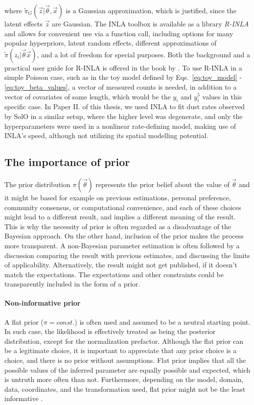 where $\tilde{\pi}_G(\vec{z}|\vec{\theta},\vec{x})$ is a Gaussian approximation, which is justified, since the latent effects $\vec{z}$ are Gaussian. The INLA toolbox is available as a library \textit{R-INLA} \citep{rinla} and allows for convenient use via a function call, including options for many popular hyperpriors, latent random effects, different approximations of $\tilde{\pi}(z_i|\vec{\theta} \vec{x})$, and a lot of freedom for special purposes. Both the background and a practical user guide for R-INLA is offered in the book by \citet{gomez2020bayesian}. To use R-INLA in a simple Poisson case, such as in the toy model defined by Eqs.~\ref{eq:toy_model} - \ref{eq:toy_beta_values}, a vector of measured counts is needed, in addition to a vector of covariates of same length, which would be the $y_i$ and $y_i^5$ values in this specific case. In Paper II. of this thesis, we used INLA to fit dust rates observed by SolO in a similar setup, where the higher level was degenerate, and only the hyperparameters were used in a nonlinear rate-defining model, making use of INLA's speed, although not utilizing its spatial modelling potential. 

\subsection{The importance of prior}

The prior distribution $\pi(\vec{\theta})$ represents the prior belief about the value of $\vec{\theta}$ and it might be based for example on previous estimations, personal preference, community consensus, or computational convenience, and each of these choices might lead to a different result, and implies a different meaning of the result. This is why the necessity of prior is often regarded as a disadvantage of the Bayesian approach. On the other hand, inclusion of the prior makes the process more transparent. A non-Bayesian parameter estimation is often followed by a discussion comparing the result with previous estimates, and discussing the limits of applicability. Alternatively, the result might not get published, if it doesn't match the expectations. The expectations and other constraints could be transparently included in the form of a prior.

\paragraph{Non-informative prior} A flat prior ($\pi = const.$) is often used and assumed to be a neutral starting point. In such case, the likelihood is effectively treated as being the posterior distribution, except for the normalization prefactor. Although the flat prior can be a legitimate choice, it is important to appreciate that any prior choice is a choice, and there is no prior without assumptions. Flat prior implies that all the possible values of the inferred parameter are equally possible and expected, which is untruth more often than not. Furthermore, depending on the model, domain, data, coordinates, and the transformation used, flat prior might not be the least informative \citep{lemoine2019moving}.

